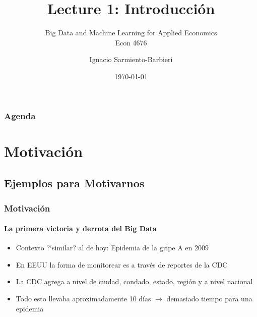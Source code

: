 \documentclass[
  shownotes,
  xcolor={svgnames},
  hyperref={colorlinks,citecolor=DarkBlue,linkcolor=DarkRed,urlcolor=DarkBlue}
  , aspectratio=169]{beamer}
\begin{document}
\title{Lecture 1: Introducción}
\subtitle{Big Data and Machine Learning for Applied Economics \\ Econ 4676}
\date{\today}

\author[Sarmiento-Barbieri]{Ignacio Sarmiento-Barbieri}


\begin{frame}[noframenumbering]
\maketitle
\end{frame}





\begin{frame}
\frametitle{Agenda}

\tableofcontents


\end{frame}


\section{Motivación}
\subsection{Ejemplos para Motivarnos}

\begin{frame}
\frametitle{Motivación}
\framesubtitle{La primera victoria y derrota del Big Data}

\begin{itemize}
  \item Contexto ?`similar? al de hoy: Epidemia de la gripe A en 2009
  \medskip
  \item En EEUU la forma de monitorear es a través de reportes de la CDC 
  \medskip
  \item La CDC agrega a nivel de ciudad, condado, estado, región y a nivel nacional
  \medskip
  \item Todo esto llevaba aproximadamente 10 días $\rightarrow$ demasiado tiempo para una epidemia
\end{itemize}
\end{frame}
\end{document}
